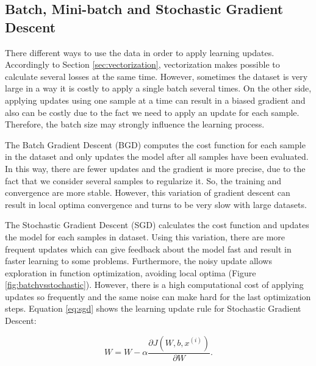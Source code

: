 \subsection{Batch, Mini-batch and Stochastic Gradient Descent}
There different ways to use the data in order to apply learning updates. Accordingly to Section \ref{sec:vectorization}, vectorization makes possible to calculate several losses at the same time. However, sometimes the dataset is very large in a way it is costly to apply a single batch several times. On the other side, applying updates using one sample at a time can result in a biased gradient and also can be costly due to the fact we need to apply an update for each sample. Therefore, the batch size may strongly influence the learning process.

The Batch Gradient Descent (BGD) computes the cost function for each sample in the dataset and only updates the model after all samples have been evaluated. In this way, there are fewer updates and the gradient is more precise, due to the fact that we consider several samples to regularize it. So, the training and convergence are more stable. However, this variation of gradient descent can result in local optima convergence and turns to be very slow with large datasets.

The Stochastic Gradient Descent (SGD) calculates the cost function and updates the model for each samples in dataset. Using this variation, there are more frequent updates which can give feedback about the model fast and result in faster learning to some problems. Furthermore, the noisy update allows exploration in function optimization, avoiding local optima (Figure \ref{fig:batchvsstochastic}). However, there is a high computational cost of applying updates so frequently and the same noise can make hard for the last optimization steps. Equation \ref{eq:sgd} shows the learning update rule for Stochastic Gradient Descent:

\begin{equation}
W = W - \alpha\frac{\partial{J(W,b, x^{(i)})}}{\partial{W}}.
\label{eq:sgd}
\end{equation}

